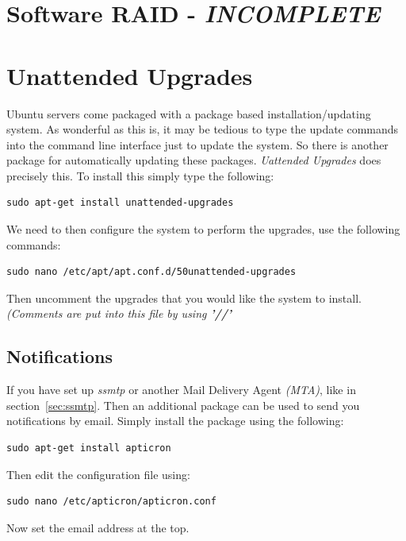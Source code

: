\section{Software RAID - \textit{INCOMPLETE}}


\section{Unattended Upgrades}

Ubuntu servers come packaged with a package based installation/updating system.  As wonderful as this is, it may be tedious to type the update commands into the command line interface just to update the system.  So there is another package for automatically updating these packages.  \textit{Uattended Upgrades} does precisely this.  To install this simply type the following:

\begin{lstlisting}
sudo apt-get install unattended-upgrades
\end{lstlisting}

We need to then configure the system to perform the upgrades, use the following commands:

\begin{lstlisting}
sudo nano /etc/apt/apt.conf.d/50unattended-upgrades
\end{lstlisting}

Then uncomment the upgrades that you would like the system to install.  \textit{(Comments are put into this file by using \textbf{'//'}}


\subsection{Notifications}

If you have set up \textit{ssmtp} or another Mail Delivery Agent \textit{(MTA)}, like in section~\ref{sec:ssmtp}.  Then an additional package can be used to send you notifications by email.  Simply install the package using the following:

\begin{lstlisting}
sudo apt-get install apticron
\end{lstlisting}

Then edit the configuration file using:

\begin{lstlisting}
sudo nano /etc/apticron/apticron.conf
\end{lstlisting}

Now set the email address at the top.

